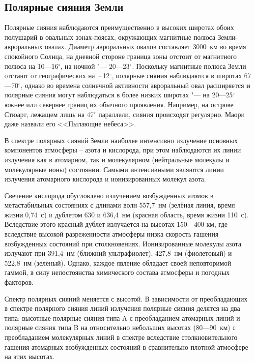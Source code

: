 \documentclass[a4paper,14pt]{article}
\begin{document}
	\subsection*{Полярные сияния Земли}
	
	Полярные сияния наблюдаются преимущественно в высоких широтах обоих полушарий в овальных зонах-поясах, окружающих магнитные полюса Земли-авроральных овалах. Диаметр авроральных овалов составляет 3000~км во время спокойного Солнца, на дневной стороне граница	зоны отстоит от магнитного полюса на 10---16$^\circ$, на ночной "--- 20---23$^\circ$. Поскольку магнитные полюса Земли отстают от географических на $\sim$12$^\circ$, полярные сияния наблюдаются в широтах 67---70$^\circ$, однако во времена солнечной активности авроральный овал расширяется и полярные сияния могут наблюдаться в более низких широтах "--- на 20---25$^\circ$ южнее или севернее границ их обычного проявления. Например, на острове Стюарт, лежащем лишь на 47$^\circ$ параллели, сияния происходят регулярно. Маори даже назвали его <<Пылающие небеса>>.
	
	В спектре полярных сияний Земли наиболее интенсивно излучение основных компонентов атмосферы -- азота и кислорода, при этом наблюдаются их линии излучения как в атомарном, так и молекулярном (нейтральные молекулы и молекулярные ионы) состоянии. Самыми интенсивными являются линии излучения атомарного кислорода и ионизированных молекул азота.
	
	Свечение кислорода обусловлено излучением возбужденных атомов в метастабильных состояниях с длинами волн 557,7~нм (зелёная линия, время жизни 0,74~с) и дублетом 630 и 636,4~нм (красная область, время жизни 110~с). Вследствие этого красный дублет излучается на высотах 150---400 км, где вследствие высокой разреженности атмосферы низка скорость гашения возбужденных состояний при столкновениях. Ионизированные молекулы азота излучают при 391,4~нм (ближний ультрафиолет), 427,8~нм (фиолетовый) и 522,8~нм (зелёный). Однако, каждое явление обладает своей неповторимой гаммой, в силу непостоянства химического состава атмосферы и погодных факторов.
	
	Спектр полярных сияний меняется с высотой. В зависимости от преобладающих в спектре полярного сияния линий излучения полярные сияния делятся на два типа: высотные полярные сияния типа A с преобладанием атомарных линий и полярные сияния типа B на относительно небольших высотах (80---90~км) с преобладанием молекулярных линий в спектре вследствие столкновительного гашения атомарных возбужденных состояний в сравнительно плотной атмосфере на этих высотах.
	
\end{document}
